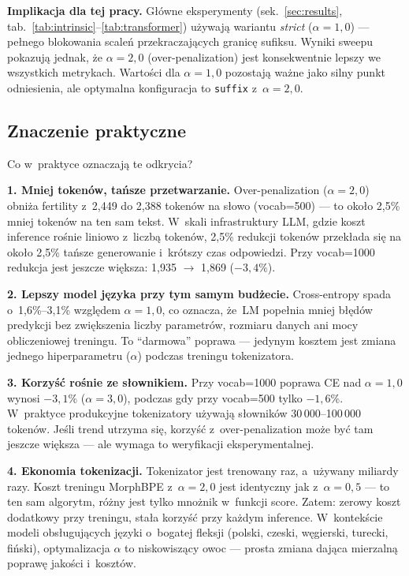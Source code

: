\textbf{Implikacja dla tej pracy.} Główne eksperymenty
(sek.~\ref{sec:results}, tab.~\ref{tab:intrinsic}--\ref{tab:transformer})
używają wariantu \emph{strict} ($\alpha = 1{,}0$) --- pełnego blokowania
scaleń przekraczających granicę sufiksu. Wyniki sweepu pokazują jednak,
że $\alpha = 2{,}0$ (over-penalization) jest konsekwentnie lepszy
we wszystkich metrykach. Wartości dla $\alpha = 1{,}0$ pozostają ważne
jako silny punkt odniesienia, ale optymalna konfiguracja to
\texttt{suffix} z~$\alpha = 2{,}0$.

\subsection*{Znaczenie praktyczne}

Co w~praktyce oznaczają te odkrycia?

\textbf{1. Mniej tokenów, tańsze przetwarzanie.}
Over-penalization ($\alpha = 2{,}0$) obniża fertility z~2{,}449 do 2{,}388
tokenów na słowo (vocab=500) --- to około 2{,}5\% mniej tokenów na ten sam tekst.
W~skali infrastruktury LLM, gdzie koszt inference rośnie liniowo
z~liczbą tokenów, 2{,}5\% redukcji tokenów przekłada się
na około 2{,}5\% tańsze generowanie i~krótszy czas odpowiedzi.
Przy vocab=1000 redukcja jest jeszcze większa: 1{,}935 $\to$ 1{,}869
($-3{,}4\%$).

\textbf{2. Lepszy model języka przy tym samym budżecie.}
Cross-entropy spada o~1{,}6\%--3{,}1\% względem $\alpha = 1{,}0$,
co oznacza, że~LM popełnia mniej błędów predykcji bez zwiększenia
liczby parametrów, rozmiaru danych ani mocy obliczeniowej treningu.
To ``darmowa'' poprawa --- jedynym kosztem jest zmiana jednego
hiperparametru ($\alpha$) podczas treningu tokenizatora.

\textbf{3. Korzyść rośnie ze słownikiem.}
Przy vocab=1000 poprawa CE nad $\alpha = 1{,}0$ wynosi $-3{,}1\%$
($\alpha = 3{,}0$), podczas gdy przy vocab=500 tylko $-1{,}6\%$.
W~praktyce produkcyjne tokenizatory używają słowników 30\,000--100\,000
tokenów. Jeśli trend utrzyma się, korzyść z~over-penalization może być
tam jeszcze większa --- ale wymaga to weryfikacji eksperymentalnej.

\textbf{4. Ekonomia tokenizacji.}
Tokenizator jest trenowany raz, a~używany miliardy razy. Koszt treningu
MorphBPE z~$\alpha = 2{,}0$ jest identyczny jak z~$\alpha = 0{,}5$
--- to ten sam algorytm, różny jest tylko mnożnik w~funkcji score.
Zatem: zerowy koszt dodatkowy przy treningu, stała korzyść
przy każdym inference. W~kontekście modeli obsługujących języki
o~bogatej fleksji (polski, czeski, węgierski, turecki, fiński),
optymalizacja $\alpha$ to niskowiszący owoc --- prosta zmiana
dająca mierzalną poprawę jakości i~kosztów.

